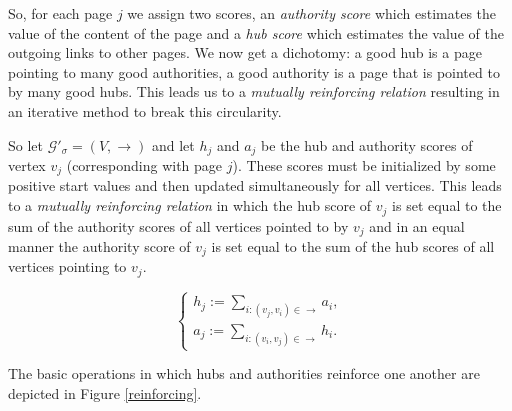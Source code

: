 \documentclass[a4paper,11pt]{report}
\newcommand{\graf}{\mathscr{G}}
\begin{document}
 So, for each page $j$ we assign two scores, an \textit{authority score} 
 which estimates the value of the content of the page and a \textit{hub 
 score} which estimates the value of the outgoing links to other pages. We now get a dichotomy: a good hub is a page pointing to many good authorities, a good 
 authority is a page that is pointed to by many good hubs. This leads us to a 
 \textit{mutually reinforcing relation}  resulting in an iterative method to 
 break this circularity.
 
So let $\graf'_\sigma = (V,\to)$ and let $h_j$ and $a_j$ be the hub and authority 
scores of vertex $v_j$ (corresponding with page $j$). These scores must be initialized by some positive start values 
and then updated simultaneously for all vertices. This leads to a \emph{mutually reinforcing relation} 
in which the hub score of $v_j$ is set equal to the sum of the authority scores of all 
vertices pointed to by $v_j$ and in an equal manner the authority score of $v_j$ 
is set equal to the sum of the hub scores of all vertices pointing to $v_j$.

$$\begin{cases} h_j := \sum_{i:(v_j,v_i)\in \to} a_i,\\ 
a_j := \sum_{i:(v_i,v_j)\in \to} h_i.
\end{cases}$$ 

The basic operations in which hubs and authorities reinforce one another are 
depicted in Figure \ref{reinforcing}.
\end{document}
